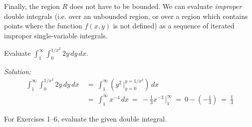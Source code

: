 Finally, the region $R$ does not have to be
bounded. We can evaluate \emph{improper} double integrals (i.e. over an unbounded region, or over a region which
contains points where the function $f(x,y)$ is not defined) as a sequence of iterated improper single-variable
integrals.
\newpage
\begin{exmp}
 Evaluate $\displaystyle\int_1^{\infty} \displaystyle\int_0^{1/{x^2}} 2y \,dy\,dx$.\vspace{1mm}
 \par\noindent \emph{Solution:}
 \begin{align*}
  \int_1^{\infty} \displaystyle\int_0^{1/{x^2}} 2y \,dy\,dx ~&=~
   \int_1^{\infty} \left(y^2 \,\Big|_{y=0}^{y=1/{x^2}} \right) \,dx\\
   &=~ \int_1^{\infty} x^{-4}\,dx 
   ~=~ -\tfrac{1}{3} x^{-3} \,\Big|_{1}^{\infty} ~=~ 0 - (-\tfrac{1}{3}) ~=~ \tfrac{1}{3}
 \end{align*}
\end{exmp}
\startexercises\label{sec3dot2}
\par\noindent For Exercises 1--6, evaluate the given double integral.
